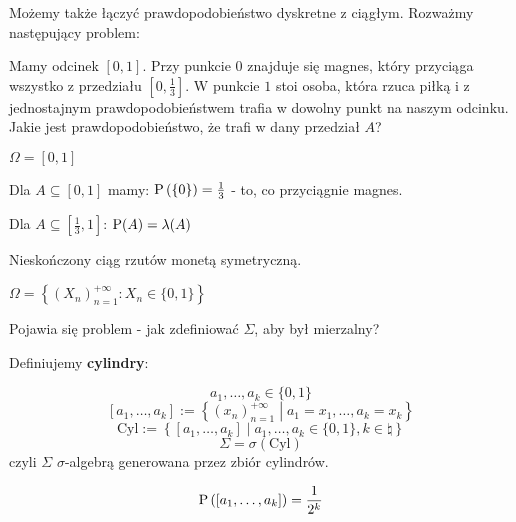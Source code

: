 \begin{example}

    Możemy także łączyć prawdopodobieństwo dyskretne z ciągłym. Rozważmy następujący problem:

    Mamy odcinek \( [0, 1] \). Przy punkcie \( 0 \) znajduje się magnes, który przyciąga wszystko z przedziału \( [0, \frac{1}{3}] \). W punkcie \( 1 \) stoi osoba, która rzuca piłką i z jednostajnym prawdopodobieństwem trafia w dowolny punkt na naszym odcinku. Jakie jest prawdopodobieństwo, że trafi w dany przedział \( A \)?

    \( \Omega = [0, 1] \)

    Dla \( A \subseteq [0, 1] \) mamy: \( \operatorname{P}\left(\{0\}\right) = \frac{1}{3} \) - to, co przyciągnie magnes.

    Dla \( A \subseteq [\frac{1}{3}, 1] \): \( \operatorname{P}(A) = \lambda(A) \)

\end{example}

\begin{example}
    Nieskończony ciąg rzutów monetą symetryczną.

    \( \Omega = \left\{ (X_n)_{n = 1}^{+\infty} : X_n \in \{0, 1\} \right\} \)

    Pojawia się problem - jak zdefiniować \( \Sigma \), aby był mierzalny?

    Definiujemy \textbf{cylindry}:

    \[ 
        a_1, \ldots, a_k \in \{0, 1\} 
    \]
    \[ 
        [a_1, \ldots, a_k] := \left\{ (x_n)_{n=1}^{+\infty} \middle| a_1 = x_1, \ldots, a_k = x_k \right\} 
    \]
    \[ 
        \text{Cyl} := \left\{ [a_1, \ldots, a_k] \middle| a_1, \ldots, a_k \in \{0, 1\}, k \in \natural \right\} 
    \]
    \[ 
        \Sigma = \sigma\left( \text{Cyl} \right) 
    \] 
    czyli \( \Sigma \) \( \sigma \)-algebrą generowana przez zbiór cylindrów.

    \[ 
        \operatorname{P}\left( [a_1, \ldots, a_k] \right) = \frac{1}{2^k} 
    \]
\end{example}
